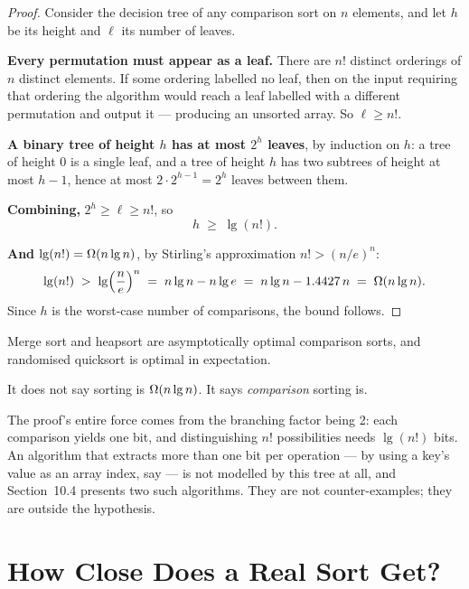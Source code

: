 \begin{proof}
Consider the decision tree of any comparison sort on $n$ elements, and let $h$
be its height and $\ell$ its number of leaves.

\smallskip
\textbf{Every permutation must appear as a leaf.} There are $n!$ distinct
orderings of $n$ distinct elements. If some ordering labelled no leaf, then on
the input requiring that ordering the algorithm would reach a leaf labelled
with a different permutation and output it --- producing an unsorted array. So
$\ell \ge n!$.

\smallskip
\textbf{A binary tree of height $h$ has at most $2^{h}$ leaves}, by induction
on $h$: a tree of height 0 is a single leaf, and a tree of height $h$ has two
subtrees of height at most $h-1$, hence at most $2 \cdot 2^{h-1} = 2^{h}$
leaves between them.

\smallskip
\textbf{Combining,} $2^{h} \ge \ell \ge n!$, so
\[ h \;\ge\; \lg(n!). \]

\smallskip
\textbf{And $\operatorname{lg}(n!) = \Omega(n\operatorname{lg} n)$}, by Stirling's approximation
$n! > (n/e)^{n}$:
\[ \operatorname{lg}(n!) \;>\; \operatorname{lg}\Bigl(\frac{n}{e}\Bigr)^{n}
   \;=\; n \operatorname{lg} n - n \operatorname{lg} e
   \;=\; n\operatorname{lg} n - 1.4427\,n \;=\; \Omega(n \operatorname{lg} n). \]
Since $h$ is the worst-case number of comparisons, the bound follows.
\end{proof}

\begin{corollary}
Merge sort and heapsort are asymptotically optimal comparison sorts, and
randomised quicksort is optimal in expectation.
\end{corollary}

\begin{alertbox}
It does not say sorting is $\Omega(n\operatorname{lg} n)$. It says \emph{comparison} sorting
is.

\smallskip
The proof's entire force comes from the branching factor being 2: each
comparison yields one bit, and distinguishing $n!$ possibilities needs
$\lg(n!)$ bits. An algorithm that extracts more than one bit per operation ---
by using a key's value as an array index, say --- is not modelled by this tree
at all, and Section~10.4 presents two such algorithms. They are not
counter-examples; they are outside the hypothesis.
\end{alertbox}

\section{How Close Does a Real Sort Get?}

